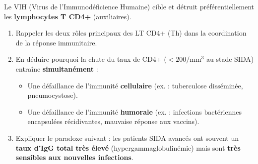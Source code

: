\documentclass[11pt]{article}
\begin{document}
\begin{exercice}
Le VIH (Virus de l'Immunodéficience Humaine) cible et détruit préférentiellement les \textbf{lymphocytes T CD4+} (auxiliaires).
\begin{enumerate}
    \item Rappeler les deux rôles principaux des LT CD4+ (Th) dans la coordination de la réponse immunitaire.
    \item En déduire pourquoi la chute du taux de CD4+ ($< 200/\text{mm}^3$ au stade SIDA) entraîne \textbf{simultanément} :
    \begin{itemize}
        \item Une défaillance de l'immunité \textbf{cellulaire} (ex. : tuberculose disséminée, pneumocystose).
        \item Une défaillance de l'immunité \textbf{humorale} (ex. : infections bactériennes encapsulées récidivantes, mauvaise réponse aux vaccins).
    \end{itemize}
    \item Expliquer le paradoxe suivant : les patients SIDA avancés ont souvent un \textbf{taux d'IgG total très élevé} (hypergammaglobulinémie) mais sont \textbf{très sensibles aux nouvelles infections}.
\end{enumerate}
\end{exercice}
\end{document}
